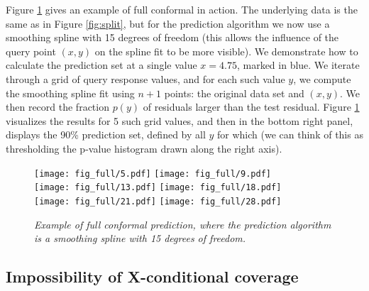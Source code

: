 \documentclass{article}
\begin{document}
Figure \ref{fig:full} gives an example of full conformal in action. The
underlying data is the same as in Figure \ref{fig:split}, but for the prediction
algorithm we now use a smoothing spline with 15 degrees of freedom (this allows
the influence of the query point $(x,y)$ on the spline fit to be more
visible). We demonstrate how to calculate the prediction set at a single value
$x=4.75$, marked in blue. We iterate through a grid of query response values,
and for each such value $y$, we compute the smoothing spline fit using $n+1$
points: the original data set and $(x,y)$. We then record the fraction $p(y)$ of
residuals larger than the test residual. Figure \ref{fig:full} visualizes the
results for 5 such grid values, and then in the bottom right panel, displays the
90\% prediction set, defined by all $y$ for which  (we can think of this as thresholding
the p-value histogram drawn along the right axis).

\begin{figure}[p]
\centering
\hspace{-10pt}
\texttt{[image: fig\_full/5.pdf]} 
\hspace{-50pt}
\texttt{[image: fig\_full/9.pdf]} \\
\hspace{-10pt}
\texttt{[image: fig\_full/13.pdf]} 
\hspace{-50pt}
\texttt{[image: fig\_full/18.pdf]} \\
\hspace{-10pt}
\texttt{[image: fig\_full/21.pdf]} 
\hspace{-50pt}
\texttt{[image: fig\_full/28.pdf]} 
\caption{\it Example of full conformal prediction, where the prediction
  algorithm is a smoothing spline with 15 degrees of freedom.}
\label{fig:full}
\end{figure}

\subsection{Impossibility of X-conditional coverage}
\label{sec:impossibility}
\end{document}
